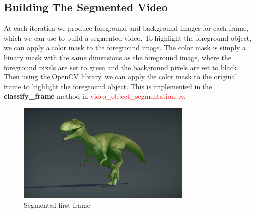 \subsection{Building The Segmented Video}\label{subsec:build-segment-video}
At each iteration we produce foreground and background images for each frame, which we can use to build a segmented video.
To highlight the foreground object, we can apply a color mask to the foreground image.
The color mask is simply a binary mask with the same dimensions as the foreground image, where the foreground pixels are set to green and the background pixels are set to black.
Then using the OpenCV library, we can apply the color mask to the original frame to highlight the foreground object.
This is implemented in the \textbf{classify\_frame} method in \textcolor{red}{video\_object\_segmentation.py}.
\begin{figure}[h!]
    \centering
    \includegraphics[scale=1.5]{new_frames/dinosaur_best/frame0}
    \caption{Segmented first frame}
    \label{fig:segmented-video}
\end{figure}

